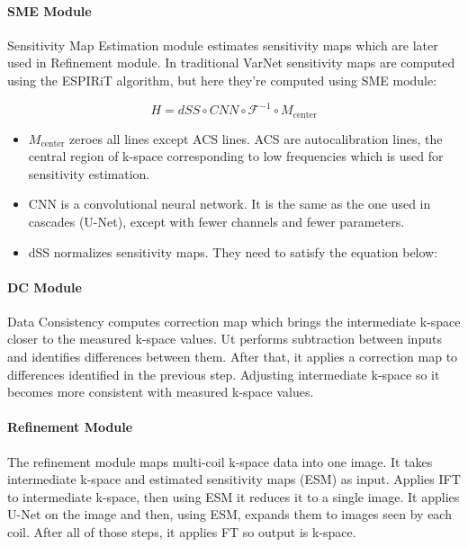 \documentclass[10pt,a4paper]{article}
\begin{document}
\paragraph{SME Module}

Sensitivity Map Estimation module estimates sensitivity maps which are later used in Refinement module. In traditional VarNet sensitivity maps are computed using the ESPIRiT algorithm, but here they're computed using SME module:

$$ H = dSS \circ CNN \circ \mathcal{F}^{-1} \circ M_{\text{center}} $$


\begin{itemize}
  \item $M_{\text{center}}$ zeroes all lines except ACS lines. ACS are autocalibration lines, the central region of k-space corresponding to low frequencies which is used for sensitivity estimation.
  \item CNN is a convolutional neural network. It is the same as the one used in cascades (U-Net), except with fewer channels and fewer parameters.
  \item dSS normalizes sensitivity maps. They need to satisfy the equation below:
\end{itemize}

\paragraph{DC Module}

Data Consistency computes correction map which brings the intermediate k-space closer to the measured k-space values. Ut performs subtraction between inputs and identifies differences between them. After that, it applies a correction map to differences identified in the previous step. Adjusting intermediate k-space so it becomes more consistent with measured k-space values.

\paragraph{Refinement Module}

The refinement module maps multi-coil k-space data into one image. It takes intermediate k-space and estimated sensitivity maps (ESM) as input. Applies IFT to intermediate k-space, then using ESM it reduces it to a single image. It applies U-Net on the image and then, using ESM, expands them to images seen by each coil. After all of those steps, it applies FT so output is k-space.
\end{document}
